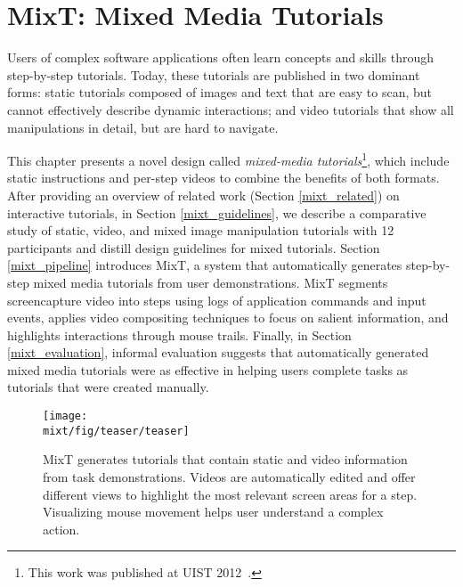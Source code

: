 \chapter{MixT: Mixed Media Tutorials}
\label{chapter_mixt}

Users of complex software applications often learn concepts and skills through step-by-step tutorials. Today, these tutorials are published in two dominant forms: static tutorials composed of images and text that are easy to scan, but cannot effectively describe dynamic interactions; and video tutorials that show all manipulations in detail, but are hard to navigate.

This chapter presents a novel design called \emph{mixed-media tutorials}\footnote{This work was published at UIST 2012~\cite{Chi:2012:MAG:2380116.2380130}.}, which include static instructions and per-step videos to combine the benefits of both formats. After providing an overview of related work (Section \ref{mixt_related}) on interactive tutorials, in Section \ref{mixt_guidelines}, we describe a comparative study of static, video, and mixed image manipulation tutorials with 12 participants and distill design guidelines for mixed tutorials.
%
Section \ref{mixt_pipeline} introduces MixT, a system that automatically generates step-by-step mixed media tutorials from user demonstrations. MixT segments screencapture video into steps using logs of application commands and input events, applies video compositing techniques to focus on salient information, and highlights interactions through mouse trails.
%
Finally, in Section \ref{mixt_evaluation}, informal evaluation suggests that automatically generated mixed media tutorials were as effective in helping users complete tasks as tutorials that were created manually.
%

\begin{figure*}[t]
  \centering
  \texttt{[image: \\mixt/fig/teaser/teaser]}
  \caption{MixT generates tutorials that contain static and video information from task demonstrations. Videos are automatically edited and offer different views to highlight the most relevant screen areas for a step. Visualizing mouse movement helps user understand a complex action.}
  \label{fig:mixt_teaser}
\end{figure*}











